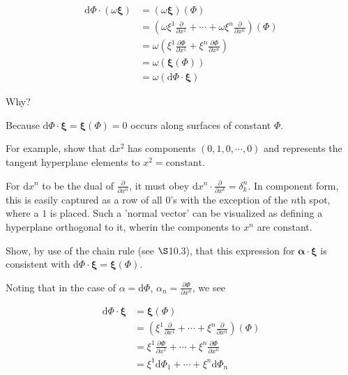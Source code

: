 \documentclass[../the-road-to-reality.tex]{subfiles}
\begin{document}
\begin{questions}
\begin{solution}
        \begin{align*}
                \mathrm{d}\Phi \cdot (\omega\mathbf{\xi}) &= (\omega\mathbf{\xi})(\Phi) \\
                &= (\omega\xi^1\frac{\partial}{\partial{x^1}} + \cdots + \omega\xi^n\frac{\partial}{\partial{x^n}})(\Phi) \\
                &= \omega(\xi^1\frac{\partial\Phi}{\partial{x^1}} + \xi^n\frac{\partial\Phi}{\partial{x^n}}) \\
                &= \omega(\mathbf{\xi}(\Phi)) \\
                &= \omega(\mathrm{d}\Phi \cdot \mathbf{\xi})
        \end{align*}
\end{solution}

\question Why?

\begin{solution}
        Because $\mathrm{d}\Phi \cdot \mathbf{\xi} = \mathbf{\xi}(\Phi) = 0$ occurs along surfaces of constant $\Phi$.
\end{solution}

\question For example, show that $\mathrm{d}x^2$ has components $(0, 1, 0, \cdots, 0)$ and represents the tangent hyperplane elements to $x^2 = \mathrm{constant}$.

\begin{solution}
        For $\mathrm{d}x^n$ to be the dual of $\frac{\partial}{\partial{x^n}}$, it must obey $\mathrm{d}x^n \cdot \frac{\partial}{\partial{x^k}} = \delta^n_k$. In component form, this is easily captured as a row of all $0$'s with the exception of the $n$th spot, where a $1$ is placed. Such a 'normal vector' can be visualized as defining a hyperplane orthogonal to it, wherin the components to $x^n$ are constant.
\end{solution}

\question Show, by use of the chain rule (see $\S$10.3), that this expression for $\mathbf{\alpha}\cdot\mathbf{\xi}$ is consistent with $\mathrm{d}\Phi \cdot \mathbf{\xi} = \mathbf{\xi}(\Phi)$.

\begin{solution}
        Noting that in the case of $\alpha = \mathrm{d}\Phi$, $\alpha_n = \frac{\partial\Phi}{\partial{x^n}}$, we see

        \begin{align*}
                \mathrm{d}\Phi \cdot \mathbf{\xi} &= \mathbf{\xi}(\Phi) \\
                &= (\xi^1\frac{\partial}{\partial{x^1}} + \cdots + \xi^n\frac{\partial}{\partial{x^n}})(\Phi) \\
                &= \xi^1\frac{\partial\Phi}{\partial{x^1}} + \cdots + \xi^n\frac{\partial\Phi}{\partial{x^n}} \\
                &= \xi^1\mathrm{d}\Phi_1 + \cdots + \xi^n\mathrm{d}\Phi_n
        \end{align*}
\end{solution}


\end{questions}
\end{document}
